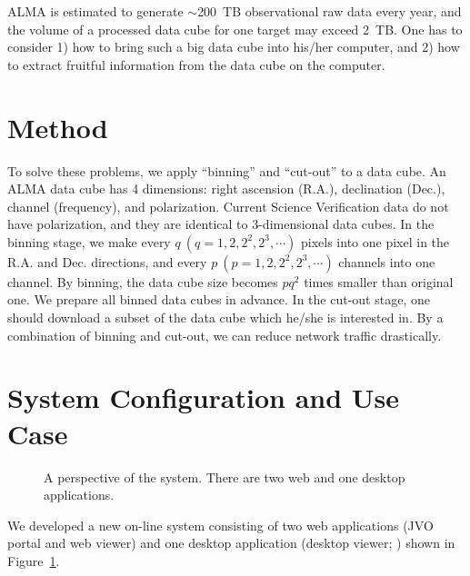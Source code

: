 ALMA is estimated to generate $\sim$200\ TB observational raw data every year, and the volume of a processed data cube for one target may exceed 2\ TB. One has to consider 1) how to bring such a big data cube into his/her computer, and 2) how to extract fruitful information from the data cube on the computer.

\section{Method}

To solve these problems, we apply ``binning'' and ``cut-out'' to a data cube. An ALMA data cube has 4 dimensions: right ascension (R.A.), declination (Dec.), channel (frequency), and polarization. Current Science Verification data do not have polarization, and they are identical to 3-dimensional data cubes. In the binning stage, we make every $q \ (q = 1, 2, 2^{2}, 2^{3}, \cdots)$ pixels into one pixel in the R.A. and Dec. directions, and every $p \ (p = 1, 2, 2^{2}, 2^{3}, \cdots)$ channels into one channel. By binning, the data cube size becomes $p q^{2}$ times smaller than original one. We prepare all binned data cubes in advance. In the cut-out stage, one should download a subset of the data cube which he/she is interested in. By a combination of binning and cut-out, we can reduce network traffic drastically.

\section{System Configuration and Use Case}

\begin{figure}
	\caption{A perspective of the system. There are two web and one desktop applications.
	\label{O10_f1}}
\end{figure}

We developed a new on-line system \citep{D5_adassxxii} consisting of two web applications (JVO portal and web viewer) and one desktop application (desktop viewer; \citealt{P047_adassxxii}) shown in Figure~\ref{O10_f1}.

